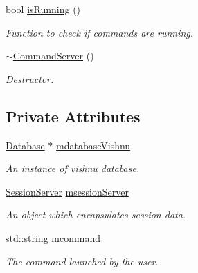 \begin{DoxyCompactItemize}
bool \hyperlink{classCommandServer_a8561a54ddb732b7d13f1ddde8bacde53}{isRunning} ()
\begin{DoxyCompactList}\small\item\em Function to check if commands are running. \item\end{DoxyCompactList}\item 
\hypertarget{classCommandServer_a89f1d55bb111f7954d022e0c63d3b87f}{
\hyperlink{classCommandServer_a89f1d55bb111f7954d022e0c63d3b87f}{$\sim$CommandServer} ()}
\label{classCommandServer_a89f1d55bb111f7954d022e0c63d3b87f}

\begin{DoxyCompactList}\small\item\em Destructor. \item\end{DoxyCompactList}\end{DoxyCompactItemize}
\subsection*{Private Attributes}
\begin{DoxyCompactItemize}
\item 
\hypertarget{classCommandServer_a509c4c4d806479c96adb21c173dfea17}{
\hyperlink{classDatabase}{Database} $\ast$ \hyperlink{classCommandServer_a509c4c4d806479c96adb21c173dfea17}{mdatabaseVishnu}}
\label{classCommandServer_a509c4c4d806479c96adb21c173dfea17}

\begin{DoxyCompactList}\small\item\em An instance of vishnu database. \item\end{DoxyCompactList}\item 
\hypertarget{classCommandServer_aa325e797756bd9ec80e216788c10aa0f}{
\hyperlink{classSessionServer}{SessionServer} \hyperlink{classCommandServer_aa325e797756bd9ec80e216788c10aa0f}{msessionServer}}
\label{classCommandServer_aa325e797756bd9ec80e216788c10aa0f}

\begin{DoxyCompactList}\small\item\em An object which encapsulates session data. \item\end{DoxyCompactList}\item 
\hypertarget{classCommandServer_a98ec7cb8ee6d06037e2c52a212e2bf77}{
std::string \hyperlink{classCommandServer_a98ec7cb8ee6d06037e2c52a212e2bf77}{mcommand}}
\label{classCommandServer_a98ec7cb8ee6d06037e2c52a212e2bf77}

\begin{DoxyCompactList}\small\item\em The command launched by the user. \item\end{DoxyCompactList}\end{DoxyCompactItemize}


